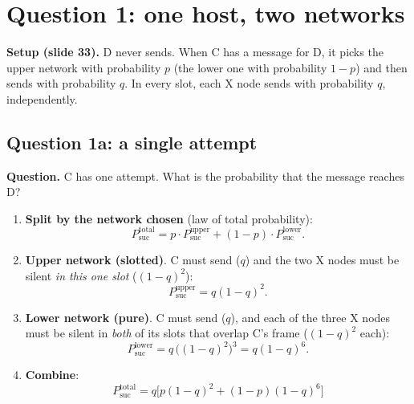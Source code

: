 \section{Question 1: one host, two networks}

\begin{center}
\end{center}

\textbf{Setup (slide 33).} D never sends. When C has a message for D, it picks the upper network with probability $p$ (the lower one with probability $1-p$) and then sends with probability $q$.
In every slot, each X node sends with probability $q$, independently.

\subsection*{Question 1a: a single attempt}
\textbf{Question.} C has one attempt. What is the probability that the message reaches D?

\begin{enumerate}
  \item \textbf{Split by the network chosen} (law of total probability):
        \[ P^{\text{total}}_{\text{suc}} = p\cdot P^{\text{upper}}_{\text{suc}} + (1-p)\cdot P^{\text{lower}}_{\text{suc}}. \]
  \item \textbf{Upper network (slotted)}. C must send ($q$) and the two X nodes must be silent \emph{in this one slot} ($(1-q)^2$):
        \[ P^{\text{upper}}_{\text{suc}} = q(1-q)^2. \]
  \item \textbf{Lower network (pure)}. C must send ($q$), and each of the three X nodes must be silent in \emph{both} of its slots that overlap C's frame ($(1-q)^2$ each):
        \[ P^{\text{lower}}_{\text{suc}} = q\,\big((1-q)^2\big)^3 = q(1-q)^6. \]
  \item \textbf{Combine}:
        \[ \boxed{\ P^{\text{total}}_{\text{suc}} = q\big[p(1-q)^2 + (1-p)(1-q)^6\big]\ } \]
\end{enumerate}

